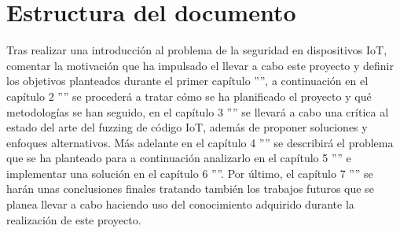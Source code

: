 \section{Estructura del documento}
Tras realizar una introducción al problema de la seguridad en dispositivos IoT, comentar la motivación que ha impulsado
el llevar a cabo este proyecto y definir los objetivos planteados durante el primer capítulo '''', a continuación en el capítulo 2 
'''' se procederá a tratar cómo se ha planificado el proyecto y qué metodologías se han seguido, en el capítulo 3 '''' se llevará a
cabo una crítica al estado del arte del fuzzing de código IoT, además de proponer soluciones y enfoques alternativos. Más adelante en el 
capítulo 4 '''' se describirá el problema que se ha planteado para a continuación analizarlo en el capítulo 5 '''' e implementar una solución en 
el capítulo 6 ''''. Por último, el capítulo 7 '''' se harán unas 
conclusiones finales tratando también los trabajos futuros que se planea llevar a cabo haciendo uso del conocimiento 
adquirido durante la realización de este proyecto.